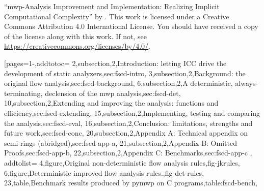 \pageIconAnalysis
{}
{\par\enquote{mwp-Analysis Improvement and Implementation: Realizing Implicit Computational Complexity} \textcopyright{ }by{ }\CTNT.
\newline{}This work is licensed under a Creative Commons Attribution 4.0 International License.
\newline{}You should have received a copy of the license along with this work.
\newline{}If not, see \url{https://creativecommons.org/licenses/by/4.0/}.}
[pages={1-},addtotoc={
    2,subsection,2,{Introduction: letting ICC drive the development of static analyzers},sec:fscd-intro,
    3,subsection,2,{Background: the original flow analysis},sec:fscd-background,
    6,subsection,2,{A deterministic, always-terminating, declension of the mwp analysis},sec:fscd-det,
    10,subsection,2,{Extending and improving the analysis: functions and efficiency},sec:fscd-extending,
    15,subsection,2,{Implementing, testing and comparing the analysis},sec:fscd-eval,
    16,subsection,2,{Conclusion: limitations, strengths and future work},sec:fscd-conc,
    20,subsection,2,{Appendix A: Technical appendix on semi-rings (abridged)},sec:fscd-app-a,
    21,subsection,2,{Appendix B: Omitted Proofs},sec:fscd-app-b,
    22,subsection,2,{Appendix C: Benchmarks},sec:fscd-app-c
}, addtolist={
    4,figure,{Original non-deterministic flow analysis rules},fig-jkrules,
    6,figure,{Deterministic improved flow analysis rules.},fig-det-rules,
    23,table,{Benchmark results produced by pymwp on C programs},table:fscd-bench},
